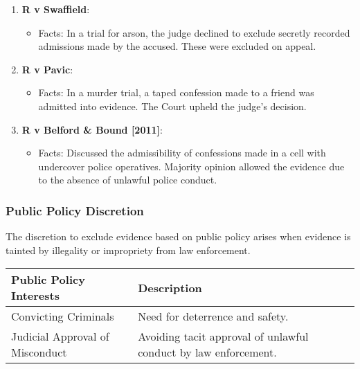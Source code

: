 \begin{enumerate}
\def\labelenumi{\arabic{enumi}.}
\tightlist
\item
  \textbf{R v Swaffield}:

  \begin{itemize}
  \tightlist
  \item
    Facts: In a trial for arson, the judge declined to exclude secretly
    recorded admissions made by the accused. These were excluded on
    appeal.
  \end{itemize}
\item
  \textbf{R v Pavic}:

  \begin{itemize}
  \tightlist
  \item
    Facts: In a murder trial, a taped confession made to a friend was
    admitted into evidence. The Court upheld the judge's decision.
  \end{itemize}
\item
  \textbf{R v Belford \& Bound {[}2011{]}}:

  \begin{itemize}
  \tightlist
  \item
    Facts: Discussed the admissibility of confessions made in a cell
    with undercover police operatives. Majority opinion allowed the
    evidence due to the absence of unlawful police conduct.
  \end{itemize}
\end{enumerate}

\subsubsection{Public Policy Discretion}\label{public-policy-discretion}

The discretion to exclude evidence based on public policy arises when
evidence is tainted by illegality or impropriety from law enforcement.

\begin{longtable}[]{@{}
  >{\raggedright\arraybackslash}p{}
  >{\raggedright\arraybackslash}p{}@{}}
\toprule\noalign{}
\begin{minipage}[b]{\linewidth}\raggedright
\textbf{Public Policy Interests}
\end{minipage} & \begin{minipage}[b]{\linewidth}\raggedright
\textbf{Description}
\end{minipage} \\
\midrule\noalign{}
\endhead
\bottomrule\noalign{}
\endlastfoot
Convicting Criminals & Need for deterrence and safety. \\
Judicial Approval of Misconduct & Avoiding tacit approval of unlawful
conduct by law enforcement. \\
\end{longtable}

